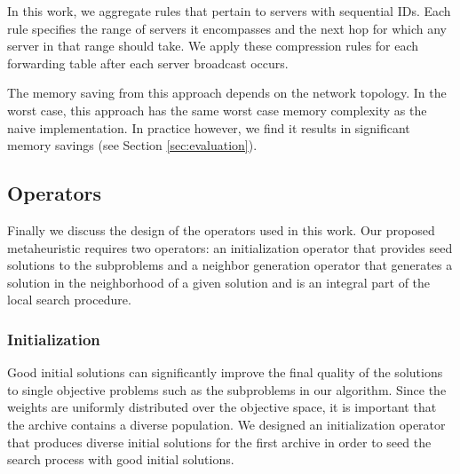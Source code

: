 In this work, we aggregate rules that pertain to servers with sequential IDs. Each rule specifies the range of servers it encompasses and the next hop for which any server in that range should take. We apply these compression rules for each forwarding table after each server broadcast occurs. 

The memory saving from this approach depends on the network topology. In the worst case, this approach has the same worst case memory complexity as the naive implementation. In practice however, we find it results in significant memory savings (see Section \ref{sec:evaluation}). 


\subsection{Operators}
\label{sec:operators}
Finally we discuss the design of the operators used in this work. Our proposed metaheuristic requires two operators: an initialization operator that provides seed solutions to the subproblems and a neighbor generation operator that generates a solution in the neighborhood of a given solution and is an integral part of the local search procedure.

\subsubsection{Initialization}
\label{sec:initialization}
Good initial solutions can significantly improve the final quality of the solutions to single objective problems \cite{VlasicDJ19,RamseyG93,OsabaDCOL14} such as the subproblems in our algorithm. Since the weights are uniformly distributed over the objective space, it is important that the archive contains a diverse population. We designed an initialization operator that produces diverse initial solutions for the first archive in order to seed the search process with good initial solutions.

